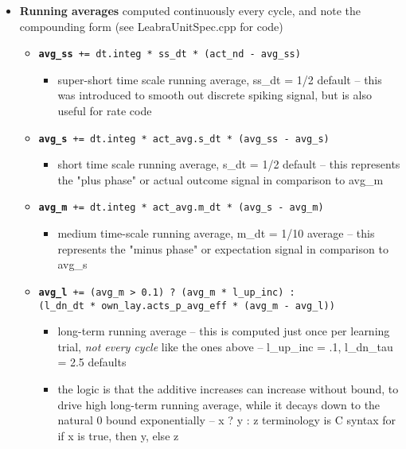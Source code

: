 \begin{itemize}
\item {\bf Running averages} computed continuously every cycle, and note the compounding form (see LeabraUnitSpec.cpp for code)
  \begin{itemize}
  \item {\tt {\bf avg\_ss} += dt.integ * ss\_dt * (act\_nd - avg\_ss)}
    \begin{itemize}
    \item super-short time scale running average, ss\_dt = 1/2 default -- this was introduced to smooth out discrete spiking signal, but is also useful for rate code
    \end{itemize}
  \item {\tt {\bf avg\_s} += dt.integ * act\_avg.s\_dt * (avg\_ss - avg\_s)}
    \begin{itemize}
    \item short time scale running average, s\_dt = 1/2 default -- this represents the "plus phase" or actual outcome signal in comparison to avg\_m
    \end{itemize}
  \item {\tt {\bf avg\_m} += dt.integ * act\_avg.m\_dt * (avg\_s - avg\_m)}
    \begin{itemize}
    \item medium time-scale running average, m\_dt = 1/10 average -- this represents the "minus phase" or expectation signal in comparison to avg\_s
    \end{itemize}
  \item {\tt {\bf avg\_l} += (avg\_m > 0.1) ? (avg\_m * l\_up\_inc) :\\
      (l\_dn\_dt * own\_lay.acts\_p\_avg\_eff * (avg\_m - avg\_l))}
    \begin{itemize}
    \item long-term running average -- this is computed just once per learning trial, {\em not every cycle} like the ones above -- l\_up\_inc = .1, l\_dn\_tau = 2.5 defaults
    \item the logic is that the additive increases can increase without bound, to drive high long-term running average, while it decays down to the natural 0 bound exponentially -- x ? y : z terminology is C syntax for if x is true, then y, else z
    \end{itemize}
  \end{itemize}


\end{itemize}
